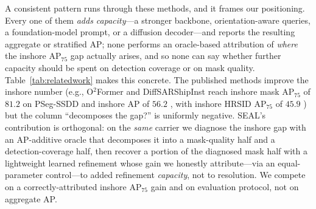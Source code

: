 \documentclass[journal]{IEEEtran}
\begin{document}
A consistent pattern runs through these methods, and it frames our positioning. Every one of them \emph{adds capacity}---a stronger backbone, orientation-aware queries, a foundation-model prompt, or a diffusion decoder---and reports the resulting aggregate or stratified AP; none performs an oracle-based attribution of \emph{where} the inshore AP$_{75}$ gap actually arises, and so none can say whether further capacity should be spent on detection coverage or on mask quality. Table~\ref{tab:relatedwork} makes this concrete. The published methods improve the inshore number (e.g., O$^2$Former and DiffSARShipInst reach inshore mask AP$_{75}$ of $81.2$ on PSeg-SSDD \cite{gao2025o2former} and inshore AP of $56.2$ \cite{xu2025diffsarshipinst}, with inshore HRSID AP$_{75}$ of $45.9$ \cite{gao2025o2former}) but the column ``decomposes the gap?'' is uniformly negative. SEAL's contribution is orthogonal: on the \emph{same} carrier we diagnose the inshore gap with an AP-additive oracle that decomposes it into a mask-quality half and a detection-coverage half, then recover a portion of the diagnosed mask half with a lightweight learned refinement whose gain we honestly attribute---via an equal-parameter control---to added refinement \emph{capacity}, not to resolution. We compete on a correctly-attributed inshore AP$_{75}$ gain and on evaluation protocol, not on aggregate AP.
\end{document}

